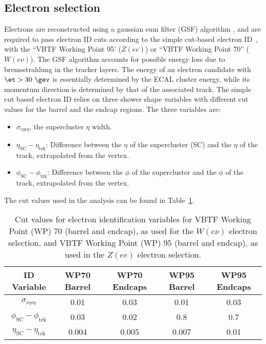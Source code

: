 \subsection{Electron selection}
\label{sec:electron_cuts}
Electrons are reconstructed using a gaussian sum 
filter (GSF) algorithm \cite{CMS-PAS-EGM-10-004},
and are required to pass electron ID cuts according 
to the simple cut-based electron ID~\cite{simplecutbasedelectronid}, 
with the ``VBTF Working Point 95' ($Z(ee)$) or ``VBTF Working Point 70'' ($W(e\nu)$). 
The GSF algorithm accounts for possible energy loss due to
bremsstrahlung in the tracker layers.
The energy of an electron candidate with $\et>30~\gev$ is essentially
determined by the ECAL cluster energy, while its momentum direction
is determined by that of the associated track.
The simple cut based electron ID relies on three shower
shape variables with different cut values for the barrel and
the endcap regions. The three variables are:
\begin{itemize}
\item $\sigma_{i\eta i\eta}$, the supercluster $\eta$ width.
\item $\eta_{\mathrm{SC}} - \eta_{\mathrm{trk}}$: Difference between
      the $\eta$ of the supercluster (SC) and the $\eta$ of the track,
      extrapolated from the vertex.
\item $\phi_{\mathrm{SC}} - \phi_{\mathrm{trk}}$: Difference between
      the $\phi$ of the supercluster and the $\phi$ of the track,
      extrapolated from the vertex.
\end{itemize}
The cut values used in the analysis can be found in
Table~\ref{tab:EleID}.
\begin{table}[htbp!]
\begin{center}
{\footnotesize
\begin{tabular}{|c|c|c|c|c|}
\hline
ID Variable & WP70 Barrel & WP70 Endcaps & WP95 Barrel & WP95 Endcaps  \\
\hline
$\sigma_{i\eta i\eta}$ & 0.01 & 0.03 & 0.01 & 0.03 \\
$\phi_{\mathrm{SC}} - \phi_{\mathrm{trk}}$ & 0.03 & 0.02 & 0.8 & 0.7 \\
$\eta_{\mathrm{SC}} - \eta_{\mathrm{trk}}$ & 0.004 & 0.005 & 0.007 & 0.01 \\
\hline
\end{tabular}
\caption[.]{\label{tab:EleID} Cut values for electron identification
variables for VBTF Working Point (WP) 70 (barrel and endcap), as used
for the $W(e\nu)$ electron selection, and VBTF Working Point (WP) 95
(barrel and endcap), as used in the $Z(ee)$ electron selection.}}
\end{center}
\end{table}

